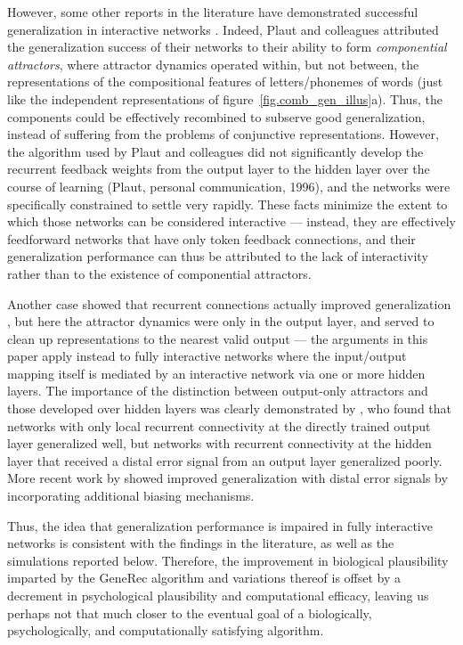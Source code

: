 \documentclass[12pt,twoside]{article}
\begin{document}
However, some other reports in the literature have demonstrated
successful generalization in interactive networks
\cite[e.g.,]{PlautMcClelland93,PlautMcClellandSeidenbergPatterson96}.
Indeed, Plaut and colleagues attributed the generalization success of
their networks to their ability to form {\em componential attractors},
where attractor dynamics operated within, but not between, the
representations of the compositional features of letters/phonemes of
words (just like the independent representations of
figure~\ref{fig.comb_gen_illus}a).  Thus, the components could be
effectively recombined to subserve good generalization, instead of
suffering from the problems of conjunctive representations.  However,
the algorithm used by Plaut and colleagues did not significantly
develop the recurrent feedback weights from the output layer to the
hidden layer over the course of learning (Plaut, personal
communication, 1996), and the networks were specifically constrained
to settle very rapidly.  These facts minimize the extent to which
those networks can be considered interactive --- instead, they are
effectively feedforward networks that have only token feedback
connections, and their generalization performance can thus be
attributed to the lack of interactivity rather than to the existence
of componential attractors.

Another case showed that recurrent connections actually improved
generalization \cite{HarmSeidenberg99}, but here the attractor
dynamics were only in the output layer, and served to clean up
representations to the nearest valid output --- the arguments in this
paper apply instead to fully interactive networks where the
input/output mapping itself is mediated by an interactive network via
one or more hidden layers.  The importance of the distinction between
output-only attractors and those developed over hidden layers was
clearly demonstrated by , who found that
networks with only local recurrent connectivity at the directly
trained output layer generalized well, but networks with recurrent
connectivity at the hidden layer that received a distal error signal
from an output layer generalized poorly.  More recent work by
 showed improved generalization with distal
error signals by incorporating additional biasing mechanisms.

Thus, the idea that generalization performance is impaired in fully
interactive networks is consistent with the findings in the
literature, as well as the simulations reported below.  Therefore, the
improvement in biological plausibility imparted by the GeneRec
algorithm and variations thereof is offset by a decrement in
psychological plausibility and computational efficacy, leaving us
perhaps not that much closer to the eventual goal of a biologically,
psychologically, and computationally satisfying algorithm.
\end{document}
